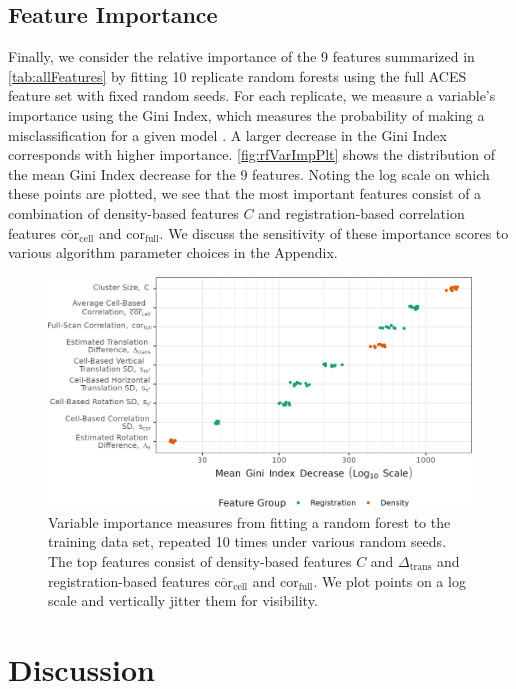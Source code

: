 \documentclass[reprint]{JASA}
\begin{document}
\hypertarget{feature-importance}{%
\subsection{Feature Importance}\label{feature-importance}}

Finally, we consider the relative importance of the 9 features
summarized in \autoref{tab:allFeatures} by fitting 10 replicate random
forests using the full ACES feature set with fixed random seeds. For
each replicate, we measure a variable's importance using the Gini Index,
which measures the probability of making a misclassification for a given
model \citep{hastie_elements_2008}. A larger decrease in the Gini Index
corresponds with higher importance. \autoref{fig:rfVarImpPlt} shows the
distribution of the mean Gini Index decrease for the 9 features. Noting
the log scale on which these points are plotted, we see that the most
important features consist of a combination of density-based features
\(C\) and registration-based correlation features
\(\overline{\text{cor}}_{\text{cell}}\) and
\(\text{cor}_{\text{full}}\). We discuss the sensitivity of these
importance scores to various algorithm parameter choices in the
Appendix.

\begin{figure}[htbp]
\includegraphics[width=.5\textwidth]{images/resultsPlots/varImpPlt} \caption{\label{fig:rfVarImpPlt} Variable importance measures from fitting a random forest to the training data set, repeated 10 times under various random seeds. The top features consist of  density-based features $C$ and $\Delta_{\text{trans}}$ and registration-based features $\overline{\text{cor}}_{\text{cell}}$ and $\text{cor}_{\text{full}}$. We plot points on a log scale and vertically jitter them for visibility.}\label{fig:unnamed-chunk-12}
\end{figure}

\hypertarget{discussion}{%
\section{Discussion}\label{discussion}}
\end{document}
